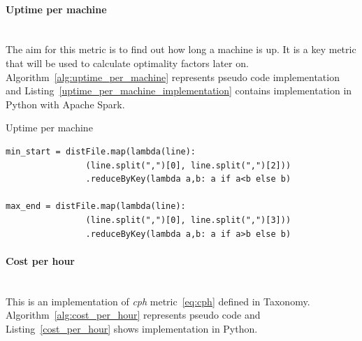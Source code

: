 \documentclass[]{final_report}
\newcommand{\myparagraph}[1]{\paragraph{#1}\mbox{}\\}
\begin{document}
\myparagraph{Uptime per machine}

The aim for this metric is to find out how long a machine is up. It is a key metric that will be used to calculate optimality factors later on. Algorithm~\ref{alg:uptime_per_machine} represents pseudo code implementation and Listing~\ref{uptime_per_machine_implementation} contains implementation in Python with Apache Spark. 

\begin{algorithm}[h]
\caption{Uptime per machine}
\label{alg:uptime_per_machine}
 \algrenewcommand{}
 \algrenewcommand{}
\end{algorithm}

\begin{minipage}{\linewidth}
\begin{lstlisting}[label={uptime_per_machine_implementation},caption={Uptime per machine implementation in Apache Spark},frame=single] 
min_start = distFile.map(lambda(line): 
                (line.split(",")[0], line.split(",")[2]))
                .reduceByKey(lambda a,b: a if a<b else b)

max_end = distFile.map(lambda(line): 
                (line.split(",")[0], line.split(",")[3]))
                .reduceByKey(lambda a,b: a if a>b else b)
\end{lstlisting}
\end{minipage}

\myparagraph{Cost per hour}

This is an implementation of \textit{cph} metric~\ref{eq:cph} defined in Taxonomy. Algorithm~\ref{alg:cost_per_hour} represents pseudo code and Listing~\ref{cost_per_hour} shows implementation in Python.
\end{document}
